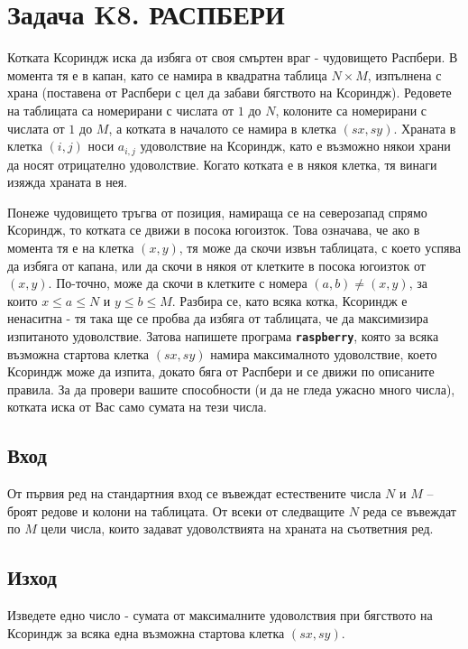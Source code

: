 \documentclass[12pt]{article}
\begin{document}
	
\section{Задача K8. РАСПБЕРИ}

Котката Ксориндж иска да избяга от своя смъртен враг - чудовището Распбери. В момента тя е в капан, като се намира в квадратна таблица $N \times M$, изпълнена с храна (поставена от Распбери с цел да забави бягството на Ксориндж). Редовете на таблицата са номерирани с числата от $1$ до $N$, колоните са номерирани с числата от $1$ до $M$, а котката в началото се намира в клетка $(sx,sy)$. Храната в клетка $(i,j)$ носи $a_{i,j}$ удоволствие на Ксориндж, като е възможно някои храни да носят отрицателно удоволствие. Когато котката е в някоя клетка, тя винаги изяжда храната в нея.

Понеже чудовището тръгва от позиция, намираща се на северозапад спрямо Ксориндж, то котката се движи в посока югоизток. Това означава, че ако в момента тя е на клетка $(x,y)$, тя може да скочи извън таблицата, с което успява да избяга от капана, или да скочи в някоя от клетките в посока югоизток от $(x,y)$. По-точно, може да скочи в клетките с номера $(a,b) \neq (x,y)$, за които $x \le a \le N$ и $y \le b \le M$. Разбира се, като всяка котка, Ксориндж е ненаситна - тя така ще се пробва да избяга от таблицата, че да максимизира изпитаното удоволствие. Затова напишете програма \textbf{\texttt{raspberry}}, която за всяка възможна стартова клетка $(sx, sy)$ намира максималното удоволствие, което Ксориндж може да изпита, докато бяга от Распбери и се движи по описаните правила. За да провери вашите способности (и да не гледа ужасно много числа), котката иска от Вас само сумата на тези числа.

\subsection{Вход}
От първия ред на стандартния вход се въвеждат естествените числа $N$ и $M$ -- броят редове и колони на таблицата. От всеки от следващите $N$ реда се въвеждат по $M$ цели числа, които задават удоволствията на храната на съответния ред.

\subsection{Изход}
Изведете едно число - сумата от максималните удоволствия при бягството на Ксориндж за всяка една възможна стартова клетка $(sx, sy)$.
\end{document}
